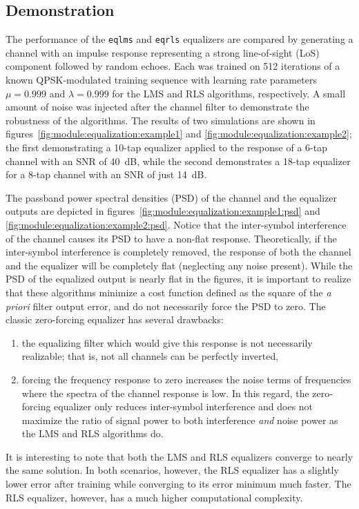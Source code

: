 \subsection{Demonstration}
\label{module:equalization:demo}
The performance of the {\tt eqlms} and {\tt eqrls} equalizers are compared by
generating a channel with an impulse response representing a strong
line-of-sight (LoS) component followed by random echoes.
Each was trained on 512 iterations of a known QPSK-modulated training sequence
with learning rate parameters $\mu=0.999$ and $\lambda=0.999$ for the LMS and
RLS algorithms, respectively.
A small amount of noise was injected after the channel filter to demonstrate
the robustness of the algorithms.
The results of two simulations are shown in
figures~\ref{fig:module:equalization:example1} and
\ref{fig:module:equalization:example2};
the first demonstrating a 10-tap equalizer applied to the response of a 6-tap
channel with an SNR of 40~dB, while the second demonstrates a 18-tap equalizer
for a 8-tap channel with an SNR of just 14~dB.

The passband power spectral densities (PSD) of the channel and the equalizer
outputs are depicted in figures~\ref{fig:module:equalization:example1:psd} and
\ref{fig:module:equalization:example2:psd}.
Notice that the inter-symbol interference of the channel causes its PSD to
have a non-flat response.
Theoretically, if the inter-symbol interference is completely removed, the
response of both the channel and the equalizer will be completely flat
(neglecting any noise present).
While the PSD of the equalized output is nearly flat in the figures,
it is important to realize that these algorithms minimize a cost function
defined as the square of the {\it a priori} filter output error, and do not
necessarily force the PSD to zero.
The classic zero-forcing equalizer has several drawbacks:
\begin{enumerate}
\item the equalizing filter which would give this response is not
      necessarily realizable; that is, not all channels can be
      perfectly inverted,
\item forcing the frequency response to zero increases the noise
      terms of frequencies where the spectra of the channel
      response is low.  In this regard, the zero-forcing equalizer
      only reduces inter-symbol interference and does not maximize
      the ratio of signal power to both interference {\it and}
      noise power as the LMS and RLS algorithms do.
\end{enumerate}
It is interesting to note that both the LMS and RLS equalizers converge to
nearly the same solution.
In both scenarios, however, the RLS equalizer has a slightly lower error after
training while converging to its error minimum much faster.
The RLS equalizer, however, has a much higher computational complexity.

